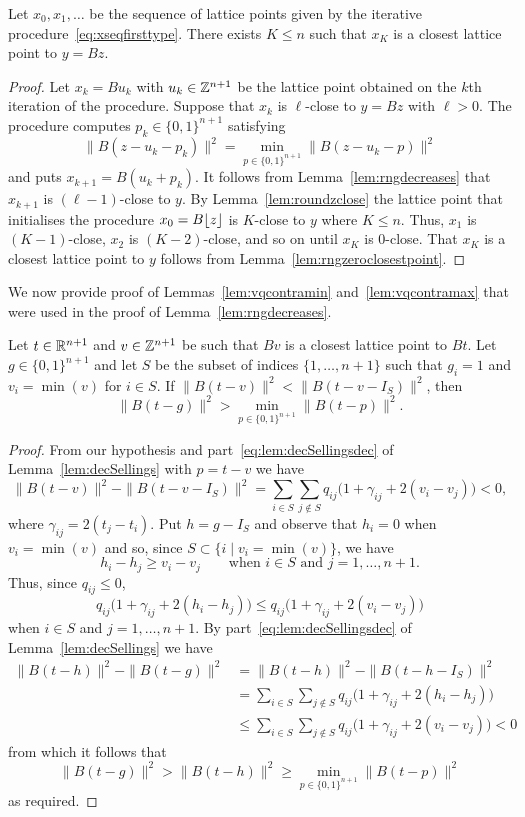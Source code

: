 \documentclass[final,leqno]{siamltex}
\begin{document}
\begin{theorem}
Let $x_0,x_1,\dots$ be the sequence of lattice points given by the iterative procedure~\eqref{eq:xseqfirsttype}.  There exists $K \leq n$ such that $x_K$ is a closest lattice point to $y = Bz$.
\end{theorem}
\begin{proof}
Let $x_k = B u_k$ with $u_k \in {\mathbb Z}^{n+1}$ be the lattice point obtained on the $k$th iteration of the procedure.  Suppose that $x_k$ is $\ell$-close to $y=Bz$ with $\ell > 0$.  The procedure computes $p_{k} \in \{0,1\}^{n+1}$ satisfying
\[
\|B(z - u_k - p_{k})\|^2 = \min_{p \in \{0,1\}^{n+1}}\|B(z - u_k - p)\|^2
\]
and puts $x_{k+1} = B(u_k + p_k)$.  It follows from Lemma~\ref{lem:rngdecreases} that $x_{k+1}$ is $(\ell-1)$-close to $y$.  By Lemma~\ref{lem:roundzclose} the lattice point that initialises the procedure $x_0 = B {\left\lfloor z \right\rfloor}$ is $K$-close to $y$ where $K \leq n$.  Thus, $x_1$ is $(K-1)$-close, $x_2$ is $(K-2)$-close, and so on until $x_K$ is $0$-close.  That $x_K$ is a closest lattice point to $y$ follows from Lemma~\ref{lem:rngzeroclosestpoint}.
\end{proof}

We now provide proof of Lemmas~\ref{lem:vqcontramin} and~\ref{lem:vqcontramax} that were used in the proof of Lemma~\ref{lem:rngdecreases}.

\begin{lemma}\label{lem:vqcontramin}
Let $t \in {\mathbb R}^{n+1}$ and $v \in {\mathbb Z}^{n+1}$ be such that $Bv$ is a closest lattice point to $Bt$.  Let $g \in \{0,1\}^{n+1}$ and let $S$ be the subset of indices $\{1,\dots,n+1\}$ such that $g_i=1$ and $v_i = \min(v)$ for $i \in S$.  If $\|B(t-v)\|^2 < \|B(t-v-I_S)\|^2$, then
\[
\|B(t - g)\|^2 > \min_{p \in \{0,1\}^{n+1}}\|B(t - p)\|^2.
\]
\end{lemma}
\begin{proof}
From our hypothesis and part~\ref{eq:lem:decSellingsdec} of Lemma~\ref{lem:decSellings} with $p = t-v$ we have
\[
\|B(t-v)\|^2 - \|B(t-v-I_S)\|^2 = \sum_{i \in S}\sum_{j \notin S}q_{ij}\big(1 + \gamma_{ij} + 2(v_i - v_j)\big) < 0,
\]
where $\gamma_{ij} = 2(t_j - t_i)$.  Put $h = g - I_S$ and observe that $h_i = 0$ when $v_i = \min(v)$ and so, since $S \subset \{i \mid v_i = \min(v) \}$, we have
\[
h_i - h_j \geq v_i - v_j \qquad \text{when $i \in S$ and $j=1,\dots,n+1$.}
\]
Thus, since $q_{ij} \leq 0$,
\[
q_{ij}\big(1 + \gamma_{ij} + 2(h_i - h_j)\big) \leq q_{ij}\big(1 + \gamma_{ij} + 2(v_i - v_j)\big)
\]
when $i \in S$ and $j =1,\dots,n+1$.  By part~\ref{eq:lem:decSellingsdec} of Lemma~\ref{lem:decSellings} we have
\begin{align*}
\|B(t-h)\|^2 - \|B(t-g)\|^2 &= \|B(t-h)\|^2 - \|B(t-h-I_S)\|^2 \\
&= \sum_{i \in S}\sum_{j \notin S}q_{ij}\big(1 + \gamma_{ij} + 2(h_i - h_j)\big) \\
&\leq \sum_{i \in S}\sum_{j \notin S}q_{ij}\big(1 + \gamma_{ij} + 2(v_i - v_j)\big) < 0
\end{align*}
from which it follows that
\[
\|B(t-g)\|^2 > \|B(t-h)\|^2 \geq \min_{p \in \{0,1\}^{n+1}}\|B(t  - p)\|^2
\]
as required.
\end{proof}
\end{document}
